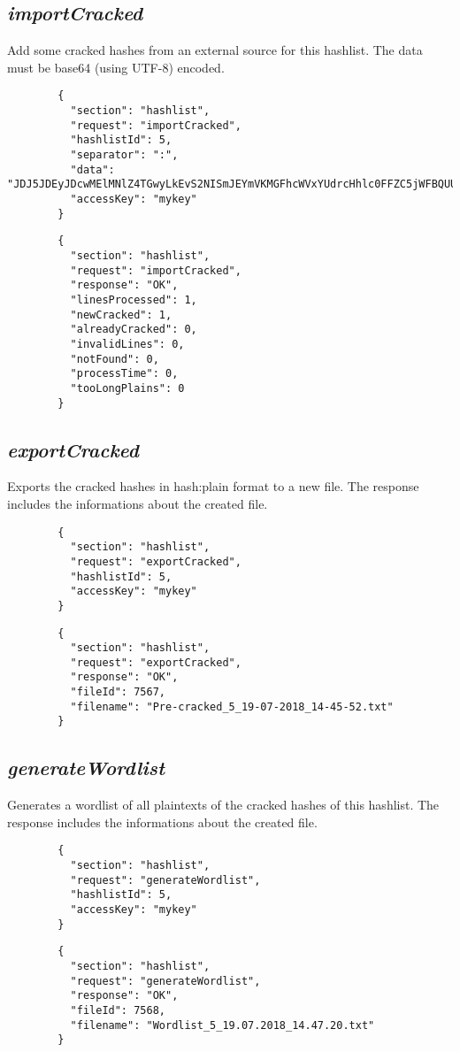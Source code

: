 \subsection*{\textit{importCracked}}
	Add some cracked hashes from an external source for this hashlist. The data must be base64 (using UTF-8) encoded.
	{
		\color{blue}
		\begin{verbatim}
		{
		  "section": "hashlist",
		  "request": "importCracked",
		  "hashlistId": 5,
		  "separator": ":",
		  "data": "JDJ5JDEyJDcwMElMNlZ4TGwyLkEvS2NISmJEYmVKMGFhcWVxYUdrcHhlc0FFZC5jWFBQUU4vWjNVN1c2OnRlc3Q=",
		  "accessKey": "mykey"
		}
		\end{verbatim}
	}
	{
		\color{OliveGreen}
		\begin{verbatim}
		{
		  "section": "hashlist",
		  "request": "importCracked",
		  "response": "OK",
		  "linesProcessed": 1,
		  "newCracked": 1,
		  "alreadyCracked": 0,
		  "invalidLines": 0,
		  "notFound": 0,
		  "processTime": 0,
		  "tooLongPlains": 0
		}
		\end{verbatim}
	}
\subsection*{\textit{exportCracked}}
	Exports the cracked hashes in hash:plain format to a new file. The response includes the informations about the created file.
	{
		\color{blue}
		\begin{verbatim}
		{
		  "section": "hashlist",
		  "request": "exportCracked",
		  "hashlistId": 5,
		  "accessKey": "mykey"
		}
		\end{verbatim}
	}
	{
		\color{OliveGreen}
		\begin{verbatim}
		{
		  "section": "hashlist",
		  "request": "exportCracked",
		  "response": "OK",
		  "fileId": 7567,
		  "filename": "Pre-cracked_5_19-07-2018_14-45-52.txt"
		}
		\end{verbatim}
	}
\subsection*{\textit{generateWordlist}}
	Generates a wordlist of all plaintexts of the cracked hashes of this hashlist. The response includes the informations about the created file.
	{
		\color{blue}
		\begin{verbatim}
		{
		  "section": "hashlist",
		  "request": "generateWordlist",
		  "hashlistId": 5,
		  "accessKey": "mykey"
		}
		\end{verbatim}
	}
	{
		\color{OliveGreen}
		\begin{verbatim}
		{
		  "section": "hashlist",
		  "request": "generateWordlist",
		  "response": "OK",
		  "fileId": 7568,
		  "filename": "Wordlist_5_19.07.2018_14.47.20.txt"
		}
		\end{verbatim}
	}
